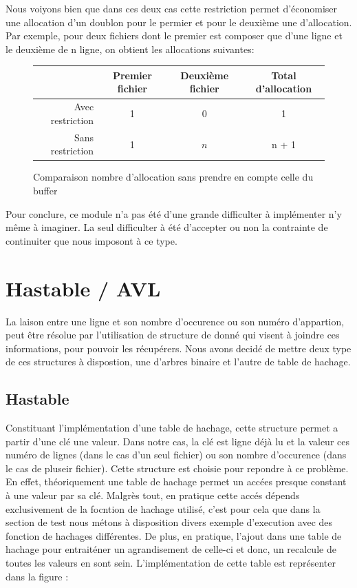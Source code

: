 \documentclass[12pt]{article}
\begin{document}
    Nous voiyons bien que dans ces deux cas cette restriction permet 
    d'économiser une allocation d'un doublon pour le permier et pour le 
    deuxième une d'allocation. Par exemple, pour deux fichiers dont le 
    premier est composer que d'une ligne et le deuxième de n ligne, on 
    obtient les allocations suivantes:\\
    \begin{figure}[ht]
        \centering
        \begin{tabular}{|r|c|c|c|}
            \hline{}
                \cellcolor{gray!25}     & Premier fichier & Deuxième fichier & 
                Total d'allocation \\
            \hline{}
            Avec restriction  & 1 & 0 & 1 \\
            \hline{}
            Sans restriction & 1 & $n$ & n + 1\\
            \hline
        \end{tabular}
        \caption{Comparaison nombre d'allocation sans prendre en compte 
        celle du buffer}\label{tab-compar-da}
    \end{figure}

    Pour conclure, ce module n'a pas été d'une grande difficulter à 
    implémenter n'y même à imaginer. La seul difficulter à été  
    d'accepter ou non la contrainte de continuiter que nous imposont à ce type.

    \section{Hastable / AVL}

    La laison entre une ligne et son nombre d'occurence ou son numéro 
    d'appartion, peut être résolue par l'utilisation de structure de donné qui 
    visent à joindre ces informations, pour pouvoir les récupérers. Nous avons 
    decidé de mettre deux type de ces structures à dispostion, une d'arbres 
    binaire et l'autre de table de hachage. 

    \subsection{Hastable}

    Constituant l'implémentation d'une table de hachage, cette structure permet 
    a partir d'une clé une valeur. Dans notre cas, la clé est ligne déjà lu et 
    la valeur ces numéro de lignes (dans le cas d'un seul fichier) ou son 
    nombre d'occurence (dans le cas de pluseir fichier). Cette structure est 
    choisie pour repondre à ce problème. En effet, théoriquement une 
    table de hachage permet un accées presque constant à une valeur par sa clé. 
    Malgrès tout, en pratique cette accés dépends exclusivement de la focntion 
    de hachage utilisé, c'est pour cela que dans la section de test nous métons 
    à disposition divers exemple d'execution avec des fonction de hachages 
    différentes. De plus, en pratique, l'ajout dans une table de hachage pour 
    entraiténer un agrandisement de celle-ci et donc, un recalcule de toutes les 
    valeurs en sont sein. L'implémentation de cette table est représenter dans 
    la figure : 
    
\end{document}
